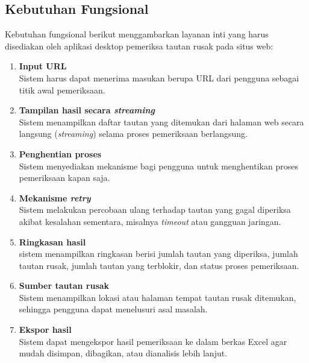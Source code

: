 \subsection{Kebutuhan Fungsional}
\label{subsec:0303-kebutuhan-fungsional}

Kebutuhan fungsional berikut menggambarkan layanan inti yang harus disediakan oleh aplikasi desktop pemeriksa tautan rusak pada situs web:

\begin{enumerate}
    \item \textbf{Input URL}\\
    Sistem harus dapat menerima masukan berupa URL dari pengguna sebagai titik awal pemeriksaan.

    \item \textbf{Tampilan hasil secara \textit{streaming}}\\
    Sistem menampilkan daftar tautan yang ditemukan dari halaman web secara langsung (\textit{streaming}) selama proses pemeriksaan berlangsung.

    \item \textbf{Penghentian proses}\\
    Sistem menyediakan mekanisme bagi pengguna untuk menghentikan proses pemeriksaan kapan saja.

    \item \textbf{Mekanisme \textit{retry}}\\
    Sistem melakukan percobaan ulang terhadap tautan yang gagal diperiksa akibat kesalahan sementara, misalnya \textit{timeout} atau gangguan jaringan.

    \item \textbf{Ringkasan hasil}\\
    sistem menampilkan ringkasan berisi jumlah tautan yang diperiksa, jumlah tautan rusak, jumlah tautan yang terblokir, dan status proses pemeriksaan.


    \item \textbf{Sumber tautan rusak}\\
    Sistem menampilkan lokasi atau halaman tempat tautan rusak ditemukan, sehingga pengguna dapat menelusuri asal masalah.

    \item \textbf{Ekspor hasil}\\
    Sistem dapat mengekspor hasil pemeriksaan ke dalam berkas Excel agar mudah disimpan, dibagikan, atau dianalisis lebih lanjut.
\end{enumerate}






